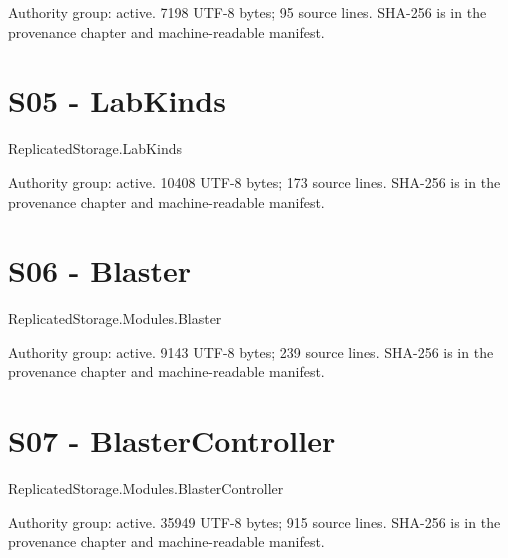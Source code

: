 Authority group: active.\allowbreak{} 7198 UTF-8 bytes; 95 source lines.\allowbreak{} SHA-256 is in the provenance chapter and machine-readable manifest.\allowbreak{}

\begingroup{}
\endgroup
\chapter{S05 - LabKinds}
\label{src:S05}
ReplicatedStorage.\allowbreak{}LabKinds

Authority group: active.\allowbreak{} 10408 UTF-8 bytes; 173 source lines.\allowbreak{} SHA-256 is in the provenance chapter and machine-readable manifest.\allowbreak{}

\begingroup{}
\endgroup
\chapter{S06 - Blaster}
\label{src:S06}
ReplicatedStorage.\allowbreak{}Modules.\allowbreak{}Blaster

Authority group: active.\allowbreak{} 9143 UTF-8 bytes; 239 source lines.\allowbreak{} SHA-256 is in the provenance chapter and machine-readable manifest.\allowbreak{}

\begingroup{}
\endgroup
\chapter{S07 - BlasterController}
\label{src:S07}
ReplicatedStorage.\allowbreak{}Modules.\allowbreak{}BlasterController

Authority group: active.\allowbreak{} 35949 UTF-8 bytes; 915 source lines.\allowbreak{} SHA-256 is in the provenance chapter and machine-readable manifest.\allowbreak{}

\begingroup{}
\endgroup
